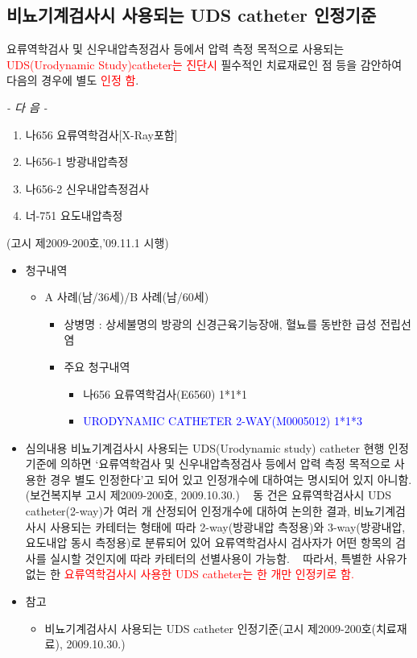 \subsection{비뇨기계검사시 사용되는 UDS catheter 인정기준}
요류역학검사 및 신우내압측정검사 등에서 압력 측정 목적으로 사용되는 \textcolor{red}{UDS(Urodynamic Study)catheter는 진단시} 필수적인 치료재료인 점 등을 감안하여 다음의 경우에 별도 \textcolor{red}{인정 함}.
\begin{center}\emph{- 다 음 -}\end{center}
\begin{enumerate}[가.]\tightlist
\item 나656 요류역학검사[X-Ray포함] 
\item 나656-1 방광내압측정 
\item 나656-2 신우내압측정검사
\item 너-751 요도내압측정 
\end{enumerate}
(고시 제2009-200호,'09.11.1 시행)\par
\par
\medskip
{}
\begin{itemize}[■]\tightlist
\item 청구내역
	\begin{itemize}[○]\tightlist
	\item A 사례(남/36세)/B 사례(남/60세)
		\begin{itemize}[-]\tightlist
		\item 상병명 : 상세불명의 방광의 신경근육기능장애, 혈뇨를 동반한 급성 전립선염
		\item 주요 청구내역 
			\begin{itemize}\tightlist
			\item 나656 요류역학검사(E6560) 1*1*1
			\item \textcolor{blue}{URODYNAMIC CATHETER 2-WAY(M0005012) 1*1*3}
			\end{itemize}
		\end{itemize}
	\end{itemize}		
\item 심의내용 \newline
비뇨기계검사시 사용되는 UDS(Urodynamic study) catheter 현행 인정기준에 의하면 ‘요류역학검사 및 신우내압측정검사 등에서 압력 측정 목적으로 사용한 경우 별도 인정한다’고 되어 있고 인정개수에 대하여는 명시되어 있지 아니함.(보건복지부 고시 제2009-200호, 2009.10.30.)
  
동 건은 요류역학검사시 UDS catheter(2-way)가 여러 개 산정되어 인정개수에 대하여 논의한 결과, 비뇨기계검사시 사용되는 카테터는 형태에 따라 2-way(방광내압 측정용)와 3-way(방광내압, 요도내압 동시 측정용)로 분류되어 있어 요류역학검사시 검사자가 어떤 항목의 검사를 실시할 것인지에 따라 카테터의 선별사용이 가능함. 
  
따라서, 특별한 사유가 없는 한 \textcolor{red}{요류역학검사시 사용한 UDS catheter는 한 개만 인정키로 함.}
  
\item 참고
	\begin{itemize}[○]\tightlist
	\item 비뇨기계검사시 사용되는 UDS catheter 인정기준(고시 제2009-200호(치료재료), 2009.10.30.)
	\end{itemize}
\end{itemize}